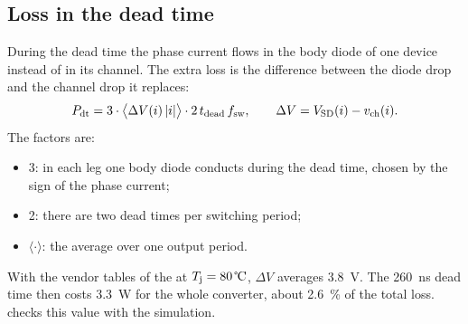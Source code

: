 \subsection{Loss in the dead time}

During the dead time the phase current flows in the body diode of one
device instead of in its channel. The extra loss is the difference between
the diode drop and the channel drop it replaces:
%
\begin{equation}
  P_\mathrm{dt} = 3 \cdot \big\langle \Delta V(i)\,|i| \big\rangle
  \cdot 2\, t_\mathrm{dead}\, f_{\mathrm{sw}} ,
  \qquad
  \Delta V = V_\mathrm{SD}(i) - v_\mathrm{ch}(i) .
  \label{eq:deadtime-loss}
\end{equation}
%
The factors are:
\begin{itemize}
  \item 3: in each leg one body diode conducts during the dead time,
        chosen by the sign of the phase current;
  \item 2: there are two dead times per switching period;
  \item $\langle\cdot\rangle$: the average over one output period.
\end{itemize}
With the vendor tables of the \device{} at $\Tj = \SI{80}{\celsius}$,
$\Delta V$ averages \SI{3.8}{\volt}. The \SI{260}{\nano\second} dead time
then costs \SI{3.3}{\watt} for the whole converter, about
\SI{2.6}{\percent} of the total loss.  checks this
value with the simulation.
